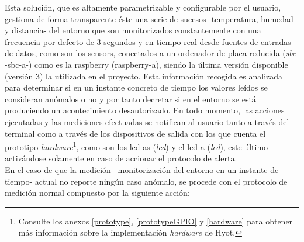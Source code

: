 \documentclass[12pt,a4paper, twoside]{report}
\begin{document}
	Esta solución, que es altamente parametrizable y configurable por el usuario, gestiona de forma transparente éste una serie de sucesos -temperatura, humedad y distancia- del entorno que son monitorizados constantemente con una frecuencia por defecto de 3 segundos y en tiempo real desde fuentes de entradas de datos, como son los \glspl{sensor}, conectados a un ordenador de placa reducida (\textit{\gls{sbc}} -\gls{sbc-a}-) como es la \gls{raspberry} (\gls{raspberry-a}), siendo la última versión disponible (versión 3) la utilizada en el proyecto. Esta información recogida es analizada para determinar si en un instante concreto de tiempo los valores leídos se consideran anómalos o no y por tanto decretar si en el entorno se está produciendo un acontecimiento desautorizado. En todo momento, las acciones ejecutadas y las mediciones efectuadas se notifican al usuario tanto a través del terminal como a través de los dispositivos de salida con los que cuenta el \gls{prototipo} \textit{hardware}\footnote{Consulte los anexos \ref{prototype}, \ref{prototypeGPIO} y \ref{hardware} para obtener más información sobre la implementación \textit{hardware} de Hyot.}, como son los \glspl{lcd-a} (\textit{\gls{lcd}}) y el \gls{led-a} (\textit{\gls{led}}), este último activándose solamente en caso de accionar el protocolo de alerta. \\	
	
	En el caso de que la medición –monitorización del entorno en un instante de tiempo- actual no reporte ningún caso anómalo, se procede con el protocolo de medición normal compuesto por la siguiente acción:
	
\end{document}
